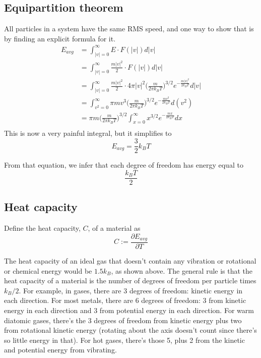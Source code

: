\documentclass[12pt]{article}
\begin{document}
\subsection{Equipartition theorem}
All particles in a system have the same RMS speed, and one way to show that is by finding an explicit formula for it.
\begin{align*}
    E_{avg} &= \int_{|v|=0}^\infty E \cdot F(|v|) d|v| \\
    &= \int_{|v|=0}^\infty \frac{m |v|^2}{2}  \cdot F(|v|) d|v| \\
    &= \int_{|v|=0}^\infty \frac{m |v|^2}{2} \cdot 4 \pi |v|^2 \Big( \frac{m}{2 \pi k_B T} \Big)^{3/2} e^{-\frac{m |v|^2}{2 k_B T}} d|v| \\
    &= \int_{v^2=0}^\infty \pi m v^3 \Big( \frac{m}{2 \pi k_B T} \Big)^{3/2} e^{-\frac{m v^2}{2 k_B T}} d(v^2) \\
    &= \pi m \Big( \frac{m}{2 \pi k_B T} \Big)^{3/2} \int_{x=0}^\infty x^{3/2} e^{-\frac{m x}{2 k_B T}} dx \\
\end{align*}
This is now a very painful integral, but it simplifies to
\[E_{avg} = \frac{3}{2} k_B T\]

From that equation, we infer that each degree of freedom has energy equal to
\[ \frac{k_B T}{2} \]


\subsection{Heat capacity}
Define the heat capacity, $C$, of a material as
\[C := \frac{\partial E_{avg}}{\partial T} \]

The heat capacity of an ideal gas that doesn't contain any vibration or rotational or chemical energy would be $1.5 k_B$, as shown above. The general rule is that the heat capacity of a material is the number of degrees of freedom per particle times $k_B / 2$. For example, in gases, there are 3 degrees of freedom: kinetic energy in each direction. For most metals, there are 6 degrees of freedom: 3 from kinetic energy in each direction and 3 from potential energy in each direction. For warm diatomic gases, there's the 3 degrees of freedom from kinetic energy plus two from rotational kinetic energy (rotating about the axis doesn't count since there's so little energy in that). For hot gases, there's those 5, plus 2 from the kinetic and potential energy from vibrating.
\end{document}
